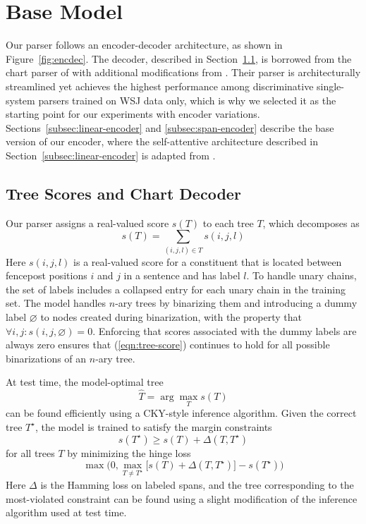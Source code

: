 \documentclass[11pt,a4paper]{article}
\begin{document}
\section{Base Model}
\label{sec:base-model}

Our parser follows an encoder-decoder architecture, as shown in Figure~\ref{fig:encdec}. The decoder, described in Section~\ref{subsec:decoder}, is borrowed from the chart parser of \citet{stern_minimal_2017} with additional modifications from \citet{gaddy_analysis_2018}. Their parser is architecturally streamlined yet achieves the highest performance among discriminative single-system parsers trained on WSJ data only, which is why we selected it as the starting point for our experiments with encoder variations. Sections~\ref{subsec:linear-encoder} and \ref{subsec:span-encoder} describe the base version of our encoder, where the self-attentive architecture described in Section~\ref{subsec:linear-encoder} is adapted from \citet{vaswani_attention_2017}.

\subsection{Tree Scores and Chart Decoder}
\label{subsec:decoder}

Our parser assigns a real-valued score $s(T)$ to each tree $T$, which decomposes as \begin{equation} s(T) = \sum_{(i,j,l)\in T} s(i,j,l) \label{eqn:tree-score}\end{equation}
Here $s(i,j,l)$ is a real-valued score for a constituent that is located between fencepost positions $i$ and $j$ in a sentence and has label $l$. To handle unary chains, the set of labels includes a collapsed entry for each unary chain in the training set. The model handles $n$-ary trees by binarizing them and introducing a dummy label $\varnothing$ to nodes created during binarization, with the property that $ \forall i,j: s(i,j,\varnothing)=0$. Enforcing that scores associated with the dummy labels are always zero ensures that (\ref{eqn:tree-score}) continues to hold for all possible binarizations of an $n$-ary tree.

At test time, the model-optimal tree $$\hat{T} = \arg\max_{T} s(T)$$ can be found efficiently using a CKY-style inference algorithm. Given the correct tree $T^\star$, the model is trained to satisfy the margin constraints $$s(T^\star) \geq s(T) + \Delta(T, T^\star)$$ for all trees $T$ by minimizing the hinge loss $$\max \Big(0, \max_{T \neq T^\star} \big[s(T) + \Delta(T, T^\star) \big] - s(T^\star)  \Big)$$
Here $\Delta$ is the Hamming loss on labeled spans, and the tree corresponding to the most-violated constraint can be found using a slight modification of the inference algorithm used at test time.
\end{document}
